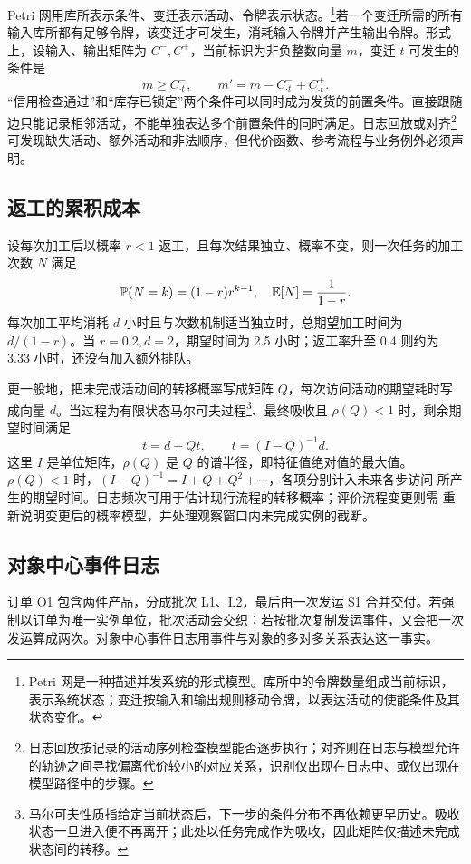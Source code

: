 Petri 网用库所表示条件、变迁表示活动、令牌表示状态。\footnote{Petri 网是一种描述并发系统的形式模型。库所中的令牌数量组成当前标识，表示系统状态；变迁按输入和输出规则移动令牌，以表达活动的使能条件及其状态变化。}若一个变迁所需的所有输入库所都有足够令牌，该变迁才可发生，消耗输入令牌并产生输出令牌。形式上，设输入、输出矩阵为 \(C^-,C^+\)，当前标识为非负整数向量 \(m\)，变迁 \(t\) 可发生的条件是
\[
m\ge C^-_{\cdot t},\qquad
m'=m-C^-_{\cdot t}+C^+_{\cdot t}.
\]
“信用检查通过”和“库存已锁定”两个条件可以同时成为发货的前置条件。直接跟随边只能记录相邻活动，不能单独表达多个前置条件的同时满足。日志回放或对齐\footnote{日志回放按记录的活动序列检查模型能否逐步执行；对齐则在日志与模型允许的轨迹之间寻找偏离代价较小的对应关系，识别仅出现在日志中、或仅出现在模型路径中的步骤。}可发现缺失活动、额外活动和非法顺序，但代价函数、参考流程与业务例外必须声明\cite{aalst2016}。

\subsection{返工的累积成本}
设每次加工后以概率 \(r<1\) 返工，且每次结果独立、概率不变，则一次任务的加工次数 \(N\) 满足
\[
\mathbb P(N=k)=(1-r)r^{k-1},\quad
\mathbb E[N]=\frac1{1-r}.
\]
每次加工平均消耗 \(d\) 小时且与次数机制适当独立时，总期望加工时间为 \(d/(1-r)\)。当 \(r=0.2,d=2\)，期望时间为 2.5 小时；返工率升至 \(0.4\) 则约为 3.33 小时，还没有加入额外排队。

更一般地，把未完成活动间的转移概率写成矩阵 \(Q\)，每次访问活动的期望耗时写成向量 \(d\)。当过程为有限状态马尔可夫过程\footnote{马尔可夫性质指给定当前状态后，下一步的条件分布不再依赖更早历史。吸收状态一旦进入便不再离开；此处以任务完成作为吸收，因此矩阵仅描述未完成状态间的转移。}、最终吸收且 \(\rho(Q)<1\) 时，剩余期望时间满足
\[
t=d+Qt,\qquad t=(I-Q)^{-1}d.
\]
这里 \(I\) 是单位矩阵，\(\rho(Q)\) 是 \(Q\) 的谱半径，即特征值绝对值的最大值。
\(\rho(Q)<1\) 时，\((I-Q)^{-1}=I+Q+Q^2+\cdots\)，各项分别计入未来各步访问
所产生的期望时间。日志频次可用于估计现行流程的转移概率；评价流程变更则需
重新说明变更后的概率模型，并处理观察窗口内未完成实例的截断。

\subsection{对象中心事件日志}
订单 O1 包含两件产品，分成批次 L1、L2，最后由一次发运 S1 合并交付。若强制以订单为唯一实例单位，批次活动会交织；若按批次复制发运事件，又会把一次发运算成两次。对象中心事件日志用事件与对象的多对多关系表达这一事实。


